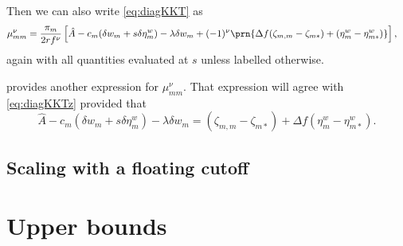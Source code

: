 \documentclass[12pt]{article}
\newcommand{\eqm}{\pi}
\newcommand{\etwm}{\eta^w}
\newcommand{\dgnm}{\zeta}
\newcommand{\wm}{w}
\begin{document}
%
Then we can also write \cref{eq:diagKKT} as
%
\begin{equation}\label{eq:diagKKTz}
\begin{aligned}
  \mu^\nu_{mm} &= \frac{\eqm_m}{2rf^\nu} 
    \left[ 
      \hat{A}
      - c_m (\delta \wm_m + s \delta \etwm_m)
      - \lambda \delta w_m
      + (-1)^\nu \prn{ 
        \Delta f (\dgnm_{m,m} - \dgnm_{m*}) 
        + (\etwm_m - \etwm_{m*})
      }
    \right],
\end{aligned}
\end{equation}
%
again with all quantities evaluated at \(s\) unless labelled otherwise.

 provides another expression for \(\mu^\nu_{mm}\).
That expression will agree with \cref{eq:diagKKTz} provided that
%
\begin{equation}\label{eq:diagAgree}
    \hat{A} - c_m (\delta \wm_m + s \delta \etwm_m)
      - \lambda \delta w_m 
      = (\dgnm_{m,m} - \dgnm_{m*}) 
        + \Delta f (\etwm_m - \etwm_{m*}).
\end{equation}
% 


\subsection{Scaling with a floating cutoff}\label{sec:cutoff}




\section{Upper bounds}\label{sec:upperbnds}
\end{document}
